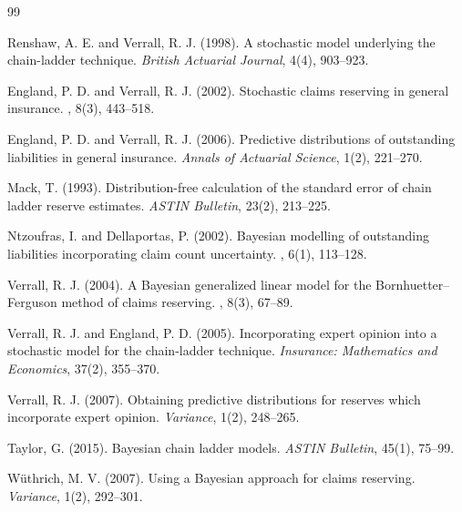 \documentclass[11pt]{article}
\newcommand{\1}{\mathbf{1}}
\begin{document}
\begin{thebibliography}{99}

Renshaw, A. E. and Verrall, R. J. (1998).
\newblock A stochastic model underlying the chain-ladder technique.
\newblock \emph{British Actuarial Journal}, 4(4), 903--923.

England, P. D. and Verrall, R. J. (2002).
\newblock Stochastic claims reserving in general insurance.
, 8(3), 443--518.

England, P. D. and Verrall, R. J. (2006).
\newblock Predictive distributions of outstanding liabilities in general insurance.
\newblock \emph{Annals of Actuarial Science}, 1(2), 221--270.

Mack, T. (1993).
\newblock Distribution-free calculation of the standard error of chain ladder reserve estimates.
\newblock \emph{ASTIN Bulletin}, 23(2), 213--225.

Ntzoufras, I. and Dellaportas, P. (2002).
\newblock Bayesian modelling of outstanding liabilities incorporating claim count uncertainty.
, 6(1), 113--128.

Verrall, R. J. (2004).
\newblock A Bayesian generalized linear model for the Bornhuetter--Ferguson method of claims reserving.
, 8(3), 67--89.

Verrall, R. J. and England, P. D. (2005).
\newblock Incorporating expert opinion into a stochastic model for the chain-ladder technique.
\newblock \emph{Insurance: Mathematics and Economics}, 37(2), 355--370.

Verrall, R. J. (2007).
\newblock Obtaining predictive distributions for reserves which incorporate expert opinion.
\newblock \emph{Variance}, 1(2), 248--265.

Taylor, G. (2015).
\newblock Bayesian chain ladder models.
\newblock \emph{ASTIN Bulletin}, 45(1), 75--99.

W\"uthrich, M. V. (2007).
\newblock Using a Bayesian approach for claims reserving.
\newblock \emph{Variance}, 1(2), 292--301.


\end{thebibliography}
\end{document}
